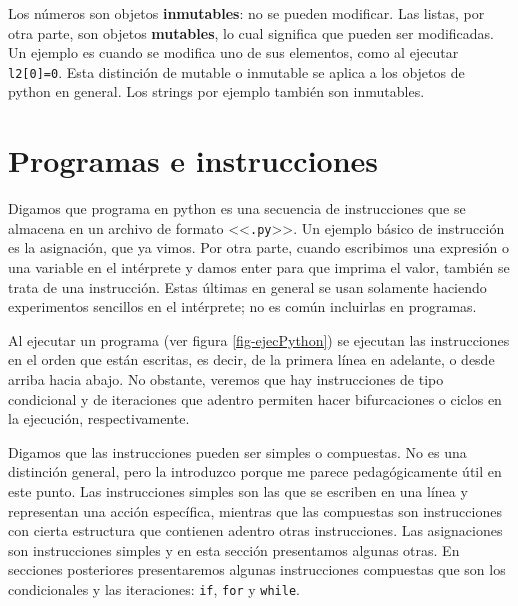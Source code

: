 \documentclass[a4paper, 12pt]{report}
\theoremstyle{definition}
\begin{document}
Los números son objetos {\bf inmutables}: no se pueden modificar. Las listas, por otra parte, son objetos {\bf mutables}, lo cual significa que pueden ser modificadas. Un ejemplo es cuando se modifica uno de sus elementos, como al ejecutar {\tt l2[0]=0}. Esta distinción de mutable o inmutable se aplica a los objetos de python en general. Los strings por ejemplo también son inmutables.



\section{Programas e instrucciones}

Digamos que programa en python es una secuencia de instrucciones que se almacena en un archivo de formato <<{\tt .py}>>. Un ejemplo básico de instrucción es la asignación, que ya vimos. Por otra parte, cuando escribimos una expresión o una variable en el intérprete y damos enter para que imprima el valor, también se trata de una instrucción. Estas últimas en general se usan solamente haciendo experimentos sencillos en el intérprete; no es común incluirlas en programas.

Al ejecutar un programa (ver figura \ref{fig-ejecPython}) se ejecutan las instrucciones en el orden que están escritas, es decir, de la primera línea en adelante, o desde arriba hacia abajo. No obstante, veremos que hay instrucciones de tipo condicional y de iteraciones que adentro permiten hacer bifurcaciones o ciclos en la ejecución, respectivamente.

Digamos que las instrucciones pueden ser simples o compuestas. No es una distinción general, pero la introduzco porque me parece pedagógicamente útil en este punto. Las instrucciones simples son las que se escriben en una línea y representan una acción específica, mientras que las compuestas son instrucciones con cierta estructura que contienen adentro otras instrucciones. Las asignaciones son instrucciones simples y en esta sección presentamos algunas otras. En secciones posteriores presentaremos algunas instrucciones compuestas que son los condicionales y las iteraciones: {\tt if}, {\tt for} y {\tt while}.
\end{document}
